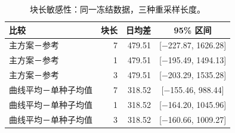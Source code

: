 \begin{table}[!htbp]
\centering\small
\caption{块长敏感性：同一冻结数据，三种重采样长度。}\label{tab:bootstrap}
\begin{tabularx}{\linewidth}{@{}Xrrc@{}}
\toprule
比较 & 块长 & 日均差 & 95\% 区间 \\
\midrule
主方案－参考 & 7 & 479.51 & [$-$227.87, 1626.28] \\
主方案－参考 & 1 & 479.51 & [$-$195.49, 1494.13] \\
主方案－参考 & 3 & 479.51 & [$-$203.29, 1535.28] \\
曲线平均－单种子均值 & 7 & 318.52 & [$-$155.46, 988.44] \\
曲线平均－单种子均值 & 1 & 318.52 & [$-$164.20, 1045.96] \\
曲线平均－单种子均值 & 3 & 318.52 & [$-$160.66, 1009.27] \\
\bottomrule
\end{tabularx}
\end{table}
